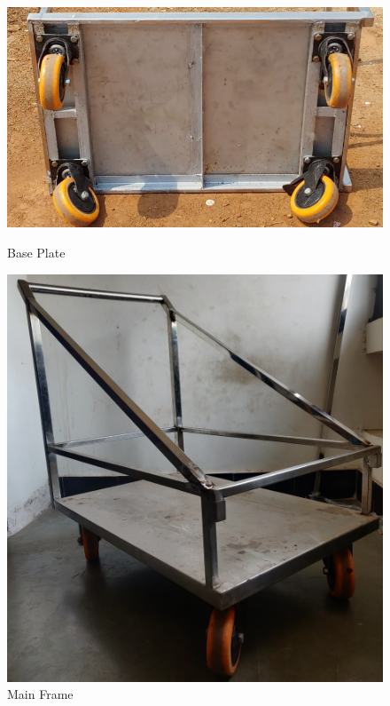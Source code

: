 \begin{figure}[H]
  \centering
    \begin{minipage}{0.55\textwidth}
    \centering
      \includegraphics[width=1\textwidth]{Base plate.jpg}
      \caption{Base Plate}
      \label{fig:Base Plate}
    \end{minipage}
\hfill
    \begin{minipage}{0.30\textwidth}
    \centering
      \includegraphics[width=1\textwidth]{Main Frame.jpg}
      \caption{Main Frame}
      \label{fig:Main Frame}
    \end{minipage}
\end{figure}

